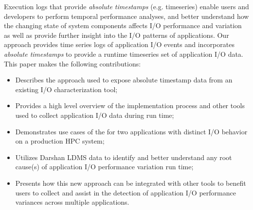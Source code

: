 
Execution logs that provide \emph{absolute timestamps}
(e.g. timeseries) enable users and developers to perform temporal
performance analyses, and better understand how the changing state of
system components affects I/O performance and variation as well as provide
further insight into the I/O patterns of applications. 
Our \Darshan{} approach provides time series logs of application I/O
events and incorporates \emph{absolute timestamps} to provide a runtime 
timeseries set of application I/O data. 
  This paper makes the following contributions:

\begin{itemize}
	\item Describes the approach used to expose absolute timestamp
          data from an existing I/O characterization tool;
       	\item Provides a high level overview of the implementation
          process and other tools used to collect application I/O data
          during run time;
  	\item Demonstrates use cases of the \connector{} for two
          applications with distinct I/O behavior on a production HPC
          system;
        \item Utilizes Darshan LDMS data to identify and better
          understand any root cause(s) of application I/O performance
          variation run time;
	\item Presents how this new approach can be integrated with
          other tools to benefit users to collect and assist in the
          detection of application I/O performance variances across
          multiple applications.
\end{itemize}

         
